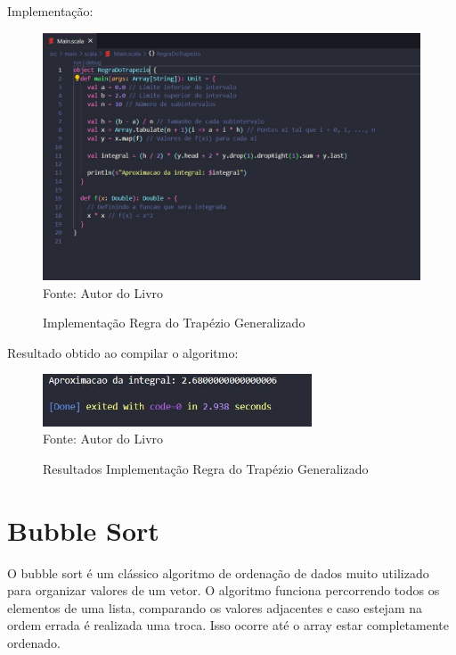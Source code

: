    Implementação:
    
	\begin{figure}[H]
		\centering
		\caption{Implementação Regra do Trapézio Generalizado}
		\label{Implementação Regra do Trapézio Generalizado}
		\includegraphics[width=17cm]{Pictures/Integral.jpg} \\
		Fonte: Autor do Livro
	\end{figure}
    
    Resultado obtido ao compilar o algoritmo: 
    
    \begin{figure}[H]
    	\centering
    	\caption{Resultados Implementação Regra do Trapézio Generalizado}
    	\label{Resultados Implementação Regra do Trapézio Generalizado}
    	\includegraphics[width=8cm]{Pictures/ResIntegral.jpg} \\
    	Fonte: Autor do Livro
    \end{figure}
    
    \section{Bubble Sort}
    O bubble sort é um clássico algoritmo de ordenação de dados muito utilizado para organizar valores de um vetor. O algoritmo funciona percorrendo todos os elementos de uma lista, comparando os valores adjacentes e caso estejam na ordem errada é realizada uma troca. Isso ocorre até o array estar completamente ordenado.
      

